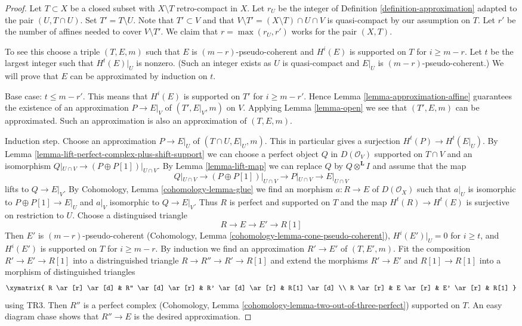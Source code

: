 \begin{proof}
Let $T \subset X$ be a closed subset with $X \setminus T$ retro-compact
in $X$. Let $r_U$ be the integer of Definition \ref{definition-approximation}
adapted to the pair $(U, T \cap U)$.
Set $T' = T \setminus U$. Note that
$T' \subset V$ and that $V \setminus T' = (X \setminus T) \cap U \cap V$
is quasi-compact by our assumption on $T$.
Let $r'$ be the number of affines needed to cover $V \setminus T'$.
We claim that $r = \max(r_U, r')$ works for the pair $(X, T)$.

\medskip\noindent
To see this choose a triple $(T, E, m)$ such that $E$ is
$(m - r)$-pseudo-coherent and $H^i(E)$ is supported on $T$ for
$i \geq m - r$. Let $t$ be the largest integer such that
$H^t(E)|_U$ is nonzero. (Such an integer exists as $U$ is quasi-compact
and $E|_U$ is $(m - r)$-pseudo-coherent.)
We will prove that $E$ can be approximated by induction on $t$.

\medskip\noindent
Base case: $t \leq m - r'$. This means that $H^i(E)$ is supported
on $T'$ for $i \geq m - r'$. Hence
Lemma \ref{lemma-approximation-affine}
guarantees the existence of an approximation
$P \to E|_V$ of $(T', E|_V, m)$ on $V$.
Applying Lemma \ref{lemma-open} we see that
$(T', E, m)$ can be approximated. Such an approximation
is also an approximation of $(T, E, m)$.

\medskip\noindent
Induction step. Choose an approximation $P \to E|_U$
of $(T \cap U, E|_U, m)$. This in particular gives a surjection
$H^t(P) \to H^t(E|_U)$. By
Lemma \ref{lemma-lift-perfect-complex-plus-shift-support}
we can choose a perfect object $Q$ in $D(\mathcal{O}_V)$
supported on $T \cap V$ and an isomorphism
$Q|_{U \cap V} \to (P \oplus P[1])|_{U \cap V}$.
By Lemma \ref{lemma-lift-map} we can replace $Q$ by
$Q \otimes^\mathbf{L} I$
and assume that the map
$$
Q|_{U \cap V} \to (P \oplus P[1])|_{U \cap V}
\longrightarrow P|_{U \cap V}
\longrightarrow
E|_{U \cap V}
$$
lifts to $Q \to E|_V$. By
Cohomology, Lemma \ref{cohomology-lemma-glue}
we find an morphism $a : R \to E$ of $D(\mathcal{O}_X)$
such that $a|_U$ is isomorphic to $P \oplus P[1] \to E|_U$
and $a|_V$ isomorphic to $Q \to E|_V$.
Thus $R$ is perfect and supported on $T$
and the map $H^t(R) \to H^t(E)$ is surjective on restriction to $U$.
Choose a distinguised triangle
$$
R \to E \to E' \to R[1]
$$
Then $E'$ is $(m - r)$-pseudo-coherent
(Cohomology, Lemma \ref{cohomology-lemma-cone-pseudo-coherent}),
$H^i(E')|_U = 0$ for $i \geq t$, and
$H^i(E')$ is supported on $T$ for $i \geq m - r$.
By induction we find an approximation $R' \to E'$
of $(T, E', m)$. Fit the composition $R' \to E' \to R[1]$
into a distringuished triangle $R \to R'' \to R' \to R[1]$
and extend the morphisms $R' \to E'$ and $R[1] \to R[1]$ into
a morphism of distinguished triangles
$$
\xymatrix{
R \ar[r] \ar[d] & R'' \ar[d] \ar[r] & R' \ar[d] \ar[r] & R[1] \ar[d] \\
R \ar[r] &  E \ar[r] & E' \ar[r] & R[1]
}
$$
using TR3. Then $R''$ is a perfect complex
(Cohomology, Lemma \ref{cohomology-lemma-two-out-of-three-perfect})
supported on $T$.
An easy diagram chase shows that $R'' \to E$ is the desired
approximation.
\end{proof}

